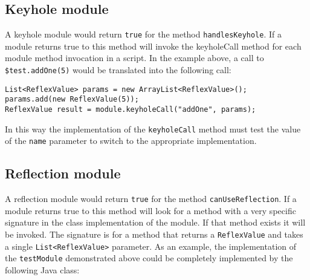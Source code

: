 \subsection{Keyhole module}
A keyhole module would return \Verb+true+ for the method \verb+handlesKeyhole+. If a module returns true to this method \Reflex will invoke the keyholeCall method for each module method invocation in a \Reflex script. In the example above, a call to \verb+$test.addOne(5)+ would be translated into the following call:

\begin{Verbatim}
List<ReflexValue> params = new ArrayList<ReflexValue>();
params.add(new ReflexValue(5));
ReflexValue result = module.keyholeCall("addOne", params);
\end{Verbatim}

In this way the implementation of the \Verb+keyholeCall+ method must test the value of the \verb+name+ parameter to switch to the appropriate implementation.

\subsection{Reflection module}
A reflection module would return \Verb+true+ for the method \verb+canUseReflection+. If a module returns true to this method \Reflex will look for a method with a very specific signature in the class implementation of the module. If that method exists it will be invoked. The signature is for a method that returns a \verb+ReflexValue+ and takes a single \verb+List<ReflexValue>+ parameter. As an example, the implementation of the \verb+testModule+ demonstrated above could be completely implemented by the following Java class:


